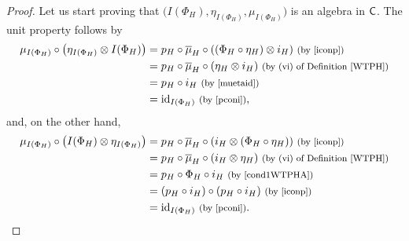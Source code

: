 \documentclass[pdftex]{sigma}
\numberwithin{equation}{section}
\begin{document}
\begin{proof}Let us start proving that $\bigl(I(\Phi_{H}),\eta_{I(\Phi_{H})},\mu_{I(\Phi_{H})}\bigr)$ is an algebra in $\sf{C}$. The unit property follows by
\begin{align*}
\mu_{I(\Phi_{H})}\circ\bigl(\eta_{I(\Phi_{H})}\otimes I(\Phi_{H})\bigr)
={}&p_{H}\circ\overline{\mu}_{H}\circ((\Phi_{H}\circ \eta_{H})\otimes i_{H})\ \text{\footnotesize\textnormal{(by \eqref{iconp})}}\\
={}&p_{H}\circ\overline{\mu}_{H}\circ(\eta_{H}\otimes i_{H})\ \text{\footnotesize\textnormal{(by (vi) of Definition \ref{WTPH})}}\\
={}&p_{H}\circ i_{H}\ \text{\footnotesize\textnormal{(by \eqref{muetaid})}}\\
={}&{\rm id}_{I(\Phi_{H})}\ \text{\footnotesize\textnormal{(by \eqref{pconi})}},
\end{align*}
and, on the other hand,
\begin{align*}
\mu_{I(\Phi_{H})}\circ\bigl(I(\Phi_{H})\otimes \eta_{I(\Phi_{H})}\bigr)
={}&p_{H}\circ\overline{\mu}_{H}\circ(i_{H}\otimes(\Phi_{H}\circ\eta_{H}))\ \text{\footnotesize\textnormal{(by \eqref{iconp})}}\\
={}&p_{H}\circ\overline{\mu}_{H}\circ(i_{H}\otimes\eta_{H})\ \text{\footnotesize\textnormal{(by (vi) of Definition \ref{WTPH})}}\\
={}&p_{H}\circ \Phi_{H}\circ i_{H}\ \text{\footnotesize\textnormal{(by \eqref{cond1WTPHA})}}\\
={}&(p_{H}\circ i_{H})\circ(p_{H}\circ i_{H})\ \text{\footnotesize\textnormal{(by \eqref{iconp})}}\\
={}&{\rm id}_{I(\Phi_{H})}\ \text{\footnotesize\textnormal{(by \eqref{pconi})}}.
\end{align*}


\end{proof}
\end{document}
